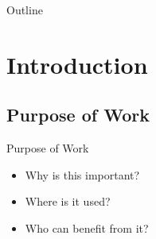 \documentclass{beamer}
\title[Thesis presentation]{\thetitle} %
\author{André Danielsson} %
\institute[KTH] %
{%
\textit{anddani@kth.se}\\ %
\medskip
Royal Institute of Technology\\
Computer Science and Communication\\ %
}
\date{\today} %
\begin{document}


\begin{frame}
\titlepage%
\end{frame}

\begin{frame}{Outline}
    \begin{scriptsize}
        \tableofcontents
    \end{scriptsize}
\end{frame}

\section{Introduction}
\subsection{Purpose of Work}
\begin{frame}{Purpose of Work}
    \begin{itemize}
        \item<1-> Why is this important?
        \item<2-> Where is it used?
        \item<3-> Who can benefit from it?
    \end{itemize}
\end{frame}
\end{document}
